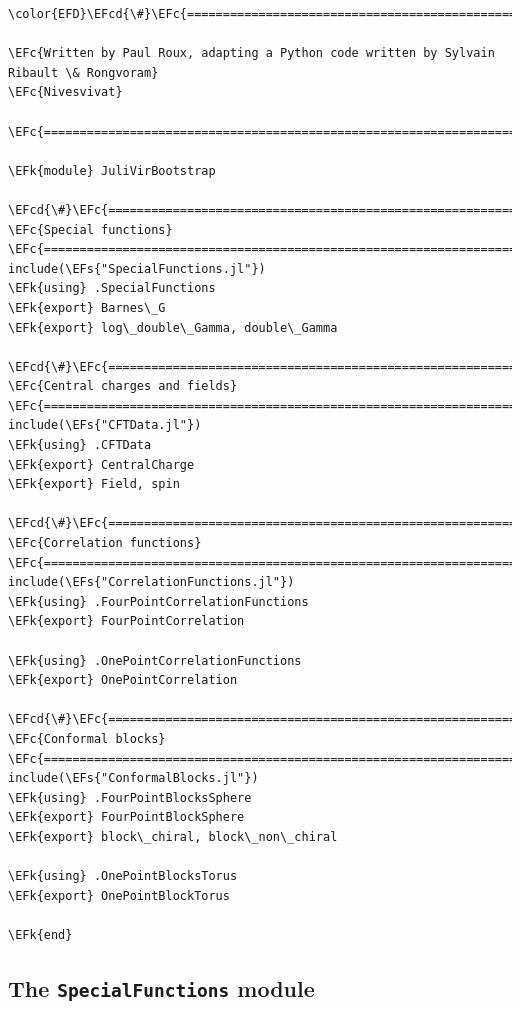 \documentclass[a4paper]{article}
\numberwithin{equation}{section}
\newcommand{\EFc}[1]{\textcolor{EFc}{#1}} %
\newcommand{\EFcd}[1]{\textcolor{EFcd}{#1}} %
\newcommand{\EFs}[1]{\textcolor{EFs}{#1}} %
\newcommand{\EFk}[1]{\textcolor{EFk}{#1}} %
\begin{document}
\begin{Code}
\begin{Verbatim}
\color{EFD}\EFcd{\#}\EFc{===========================================================================================}

\EFc{Written by Paul Roux, adapting a Python code written by Sylvain Ribault \& Rongvoram}
\EFc{Nivesvivat}

\EFc{===========================================================================================\#}

\EFk{module} JuliVirBootstrap

\EFcd{\#}\EFc{===========================================================================================}
\EFc{Special functions}
\EFc{===========================================================================================\#}
include(\EFs{"SpecialFunctions.jl"})
\EFk{using} .SpecialFunctions
\EFk{export} Barnes\_G
\EFk{export} log\_double\_Gamma, double\_Gamma

\EFcd{\#}\EFc{===========================================================================================}
\EFc{Central charges and fields}
\EFc{===========================================================================================\#}
include(\EFs{"CFTData.jl"})
\EFk{using} .CFTData
\EFk{export} CentralCharge
\EFk{export} Field, spin

\EFcd{\#}\EFc{===========================================================================================}
\EFc{Correlation functions}
\EFc{===========================================================================================\#}
include(\EFs{"CorrelationFunctions.jl"})
\EFk{using} .FourPointCorrelationFunctions
\EFk{export} FourPointCorrelation

\EFk{using} .OnePointCorrelationFunctions
\EFk{export} OnePointCorrelation

\EFcd{\#}\EFc{===========================================================================================}
\EFc{Conformal blocks}
\EFc{===========================================================================================\#}
include(\EFs{"ConformalBlocks.jl"})
\EFk{using} .FourPointBlocksSphere
\EFk{export} FourPointBlockSphere
\EFk{export} block\_chiral, block\_non\_chiral

\EFk{using} .OnePointBlocksTorus
\EFk{export} OnePointBlockTorus

\EFk{end}
\end{Verbatim}
\end{Code}
\subsection{The \texttt{SpecialFunctions} module}
\label{sec:org114e461}
\end{document}
